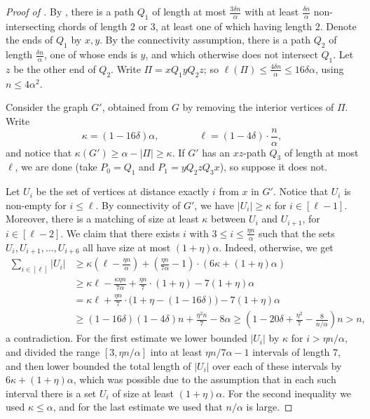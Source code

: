 \documentclass[11pt,english]{article}
\theoremstyle{plain}
\theoremstyle{definition}
\theoremstyle{remark}
\begin{document}
		\begin{proof}[Proof of ]

			By , there is a path $Q_1$ of length at most $\frac{3\delta n}{\alpha}$ with at least $\frac{\delta n}{\alpha}$ non-intersecting chords of length $2$ or $3$, at least one of which having length $2$. Denote the ends of $Q_1$ by $x, y$. By the connectivity assumption, there is a path $Q_2$ of length $\frac{\delta n}{\alpha}$, one of whose ends is $y$, and which otherwise does not intersect $Q_1$. Let $z$ be the other end of $Q_2$. Write $\Pi = x Q_1 y Q_2 z$; so $\ell(\Pi) \le \frac{4\delta n}{\alpha} \le 16 \delta \alpha$, using $n \le 4\alpha^2$. 

			Consider the graph $G'$, obtained from $G$ by removing the interior vertices of $\Pi$. Write 
			\begin{equation*}
				\kappa = (1 - 16\delta)\alpha,
				\qquad
				\qquad
				\ell = (1 - 4\delta)\cdot\frac{n}{\alpha},
			\end{equation*}
			and notice that $\kappa(G') \ge \alpha - |\Pi| \ge \kappa$. If $G'$ has an $xz$-path $Q_3$ of length at most $\ell$, we are done (take $P_0 = Q_1$ and $P_1 = yQ_2zQ_3x$), so suppose it does not.

			Let $U_i$ be the set of vertices at distance exactly $i$ from $x$ in $G'$. Notice that $U_i$ is non-empty for $i \le \ell$. By connectivity of $G'$, we have $|U_i| \ge \kappa$ for $i \in [\ell-1]$. Moreover, there is a matching of size at least $\kappa$ between $U_i$ and $U_{i+1}$, for $i \in [\ell-2]$. We claim that there exists $i$ with $3 \le i \le \frac{\eta n}{\alpha}$ such that the sets $U_{i}, U_{i+1}, \ldots, U_{i+6}$ all have size at most $(1 + \eta)\alpha$. Indeed, otherwise, we get
			\begin{align*}
				\sum_{i \in [\ell]} |U_i| 
				& \ge \kappa \left(\ell - \frac{\eta n}{\alpha}\right) + \left(\frac{\eta n}{7\alpha} - 1\right)\cdot \left(6 \kappa + (1 + \eta)\alpha\right) \\
				& \ge \kappa \ell - \frac{\kappa \eta n}{7 \alpha} + \frac{\eta n}{7} \cdot (1 + \eta) - 7(1 + \eta)\alpha \\
				& = \kappa \ell + \frac{\eta n}{7}\cdot \big(1 + \eta - (1 - 16\delta)\big) - 7(1 + \eta)\alpha \\
				& \ge (1 - 16\delta)(1 - 4\delta)n + \frac{\eta^2n}{7} - 8\alpha
				\ge \left(1 - 20\delta + \frac{\eta^2}{7} - \frac{8}{n/\alpha}\right)n > n,
			\end{align*}
			a contradiction. 
			For the first estimate we lower bounded $|U_i|$ by $\kappa$ for $i > \eta n / \alpha$, and divided the range $[3, \eta n / \alpha]$ into at least $\eta n / 7 \alpha - 1$ intervals of length $7$, and then lower bounded the total length of $|U_i|$ over each of these intervals by $6\kappa + (1 + \eta)\alpha$, which was possible due to the assumption that in each such interval there is a set $U_i$ of size at least $(1 + \eta)\alpha$.
			For the second inequality we used $\kappa \le \alpha$, and for the last estimate we used that $n/\alpha$ is large. 


\end{proof}
\end{document}
